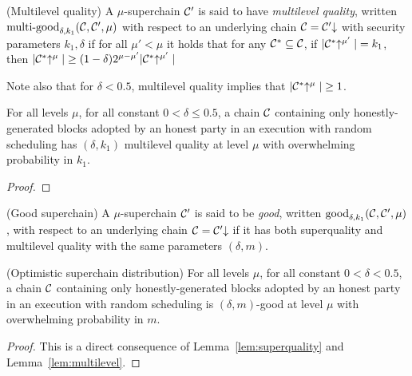 \begin{definition}{(Multilevel quality)}
A $\mu$-superchain $\mathcal{C}'$ is said to have \textit{multilevel quality}, written
$\textnormal{multi-good}_{\delta, k_1}(\mathcal{C}, \mathcal{C}', \mu)$ with respect to an
underlying chain $\mathcal{C} = \mathcal{C}'\negthickspace\downarrow$ with security parameters $k_1,
\delta$ if for all $\mu' < \mu$ it holds that for any $\mathcal{C}^* \subseteq \mathcal{C}$,
if $|\mathcal{C}^*\negthickspace\uparrow^{\mu'}| = k_1$, then $|\mathcal{C}^*\negthickspace\uparrow^{\mu}| \geq (1 -
\delta)2^{\mu - \mu'}|\mathcal{C}^*\negthickspace\uparrow^{\mu'}|$
\end{definition}

Note also that for $\delta < 0.5$, multilevel quality implies that
$|\mathcal{C}^*\negthickspace\uparrow^{\mu}| \geq 1$.

\begin{lemma}\label{lem:multilevel}
For all levels $\mu$, for all constant $0 < \delta \leq 0.5$, a chain $\mathcal{C}$
containing only honestly-generated blocks adopted by an honest party in an
execution with random scheduling has $(\delta, k_1)$ multilevel quality at level
$\mu$ with overwhelming probability in $k_1$.
\end{lemma}
\begin{proof}
\end{proof}

\begin{definition}{(Good superchain)}\label{lem:good}
A $\mu$-superchain $\mathcal{C}'$ is said to be \textit{good}, written
$\textnormal{good}_{\delta, k_1}(\mathcal{C}, \mathcal{C}', \mu)$, with respect to an
underlying chain $\mathcal{C} = \mathcal{C}'\negthickspace\downarrow$ if it has both superquality and multilevel quality with the same parameters $(\delta, m)$.
\end{definition}

\begin{corollary}{(Optimistic superchain distribution)}
For all levels $\mu$, for all constant $0 < \delta < 0.5$, a chain
$\mathcal{C}$ containing only honestly-generated blocks adopted by an honest party in
an execution with random scheduling is $(\delta, m)$-good at level
$\mu$ with overwhelming probability in $m$.
\end{corollary}
\begin{proof}
This is a direct consequence of Lemma~\ref{lem:superquality} and
Lemma~\ref{lem:multilevel}.
\end{proof}
